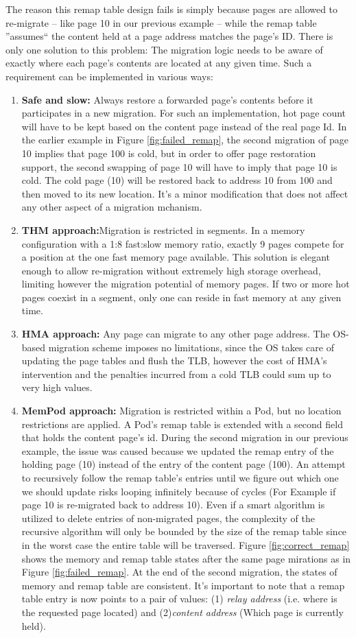 The reason this remap table design fails is simply because pages are allowed to re-migrate -- like page 10 in our previous example -- while the remap table ''assumes`` the content held at a page address matches the page's ID.  There is only one solution to this problem: The migration logic needs to be aware of exactly where each page's contents are located at any given time. Such a requirement can be implemented in various ways:
\begin{enumerate}
	\item \textbf{Safe and slow:} Always restore a forwarded page's contents before it participates in a new migration. For such an implementation, hot page count will have to be kept based on the content page instead of the real page Id. In the earlier example in Figure \ref{fig:failed_remap}, the second migration of page 10 implies that page 100 is cold, but in order to offer page restoration support, the second swapping of page 10 will have to imply that page 10 is cold. The cold page (10) will be restored back to address 10 from 100 and then moved to its new location. It's a minor modification that does not affect any other aspect of a migration mchanism.
	\item \textbf{THM approach:}Migration is restricted in segments. In a memory configuration with a 1:8 fast:slow memory ratio, exactly 9 pages compete for a position at the one fast memory page available. This solution is elegant enough to allow re-migration without extremely high storage overhead, limiting however the migration potential of memory pages. If two or more hot pages coexist in a segment, only one can reside in fast memory at any given time.
	\item \textbf{HMA approach:} Any page can migrate to any other page address. The OS-based migration scheme imposes no limitations, since the OS takes care of updating the page tables and flush the TLB, however the cost of HMA's intervention and the penalties incurred from a cold TLB could sum up to very high values.
	\item \textbf{MemPod approach:} Migration is restricted within a Pod, but no location restrictions are applied. A Pod's remap table is extended with a second field that holds the content page's id. During the second migration in our previous example, the issue was caused because we updated the remap entry of the holding page (10) instead of the entry of the content page (100). An attempt to recursively follow the remap table's entries until we figure out which one we should update risks looping infinitely because of cycles (For Example if page 10 is re-migrated back to address 10). Even if a smart algorithm is utilized to delete entries of non-migrated pages, the complexity of the recursive algorithm will only be bounded by the size of the remap table since in the worst case the entire table will be traversed. Figure \ref{fig:correct_remap} shows the memory and remap table states after the same page mirations as in Figure \ref{fig:failed_remap}. At the end of the second migration, the states of memory and remap table are consistent. It's important to note that a remap table entry is now points to a pair of values: (1) \textit{relay address} (i.e. where is the requested page located) and (2)\textit{content address} (Which page is currently held).

\end{enumerate}
